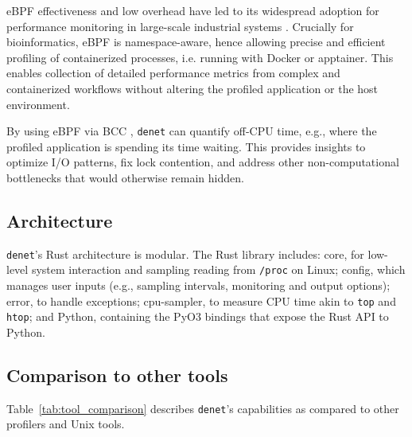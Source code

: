 \documentclass[10pt]{article}
\begin{document}
eBPF effectiveness and low overhead have led to its widespread adoption for performance monitoring in large-scale industrial systems \cite{benson2024netedit}. Crucially for bioinformatics, eBPF is namespace-aware, hence allowing precise and efficient profiling of containerized processes, i.e. running with Docker or apptainer. This enables collection of detailed performance metrics from complex and containerized workflows without altering the profiled application or the host environment.

By using eBPF via BCC \cite{bcc}, \texttt{denet} can quantify off-CPU time, e.g., where the profiled application is spending its time waiting. This provides insights to optimize I/O patterns, fix lock contention, and address other non-computational bottlenecks that would otherwise remain hidden.

\subsection*{Architecture}

\texttt{denet}'s Rust architecture is modular. The Rust library includes: core, for low-level system interaction and sampling reading from \texttt{/proc} on Linux; config, which manages user inputs (e.g., sampling intervals, monitoring and output options); error, to handle exceptions; cpu-sampler, to measure CPU time akin to \texttt{top} and \texttt{htop}; and Python, containing the PyO3 bindings that expose the Rust API to Python.

\subsection*{Comparison to other tools}

\vspace{-0.1cm}

Table~\ref{tab:tool_comparison} describes \texttt{denet}'s capabilities as compared to other profilers and Unix tools.
\end{document}
